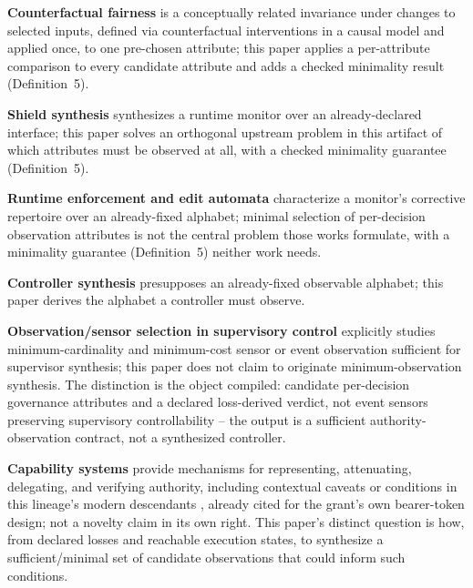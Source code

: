 \documentclass[11pt,a4paper]{article}
\theoremstyle{definition}
\begin{document}
\textbf{Counterfactual fairness} \cite{counterfactual-fairness} is a conceptually related invariance under changes to selected inputs, defined via counterfactual interventions in a causal model and applied once, to one pre-chosen attribute; this paper applies a per-attribute comparison to every candidate attribute and adds a checked minimality result (Definition~5).

\textbf{Shield synthesis} \cite{bloem-shield-synthesis-2015} synthesizes a runtime monitor over an already-declared interface; this paper solves an orthogonal upstream problem in this artifact of which attributes must be observed at all, with a checked minimality guarantee (Definition~5).

\textbf{Runtime enforcement and edit automata} \cite{schneider-enforceable-security-policies-2000,ligatti-bauer-walker-edit-automata-2005} characterize a monitor's corrective repertoire over an already-fixed alphabet; minimal selection of per-decision observation attributes is not the central problem those works formulate, with a minimality guarantee (Definition~5) neither work needs.

\textbf{Controller synthesis} \cite{ramadge-wonham-supervisory-control-1987,pnueli-rosner-reactive-synthesis-1989} presupposes an already-fixed observable alphabet; this paper derives the alphabet a controller must observe.

\textbf{Observation/sensor selection in supervisory control} \cite{rohloff-khuller-kortsarz-sensor-selection-2006,hu-chen-minimal-event-observation-2026} explicitly studies minimum-cardinality and minimum-cost sensor or event observation sufficient for supervisor synthesis; this paper does not claim to originate minimum-observation synthesis. The distinction is the object compiled: candidate per-decision governance attributes and a declared loss-derived verdict, not event sensors preserving supervisory controllability -- the output is a sufficient authority-observation contract, not a synthesized controller.

\textbf{Capability systems} \cite{dennis-van-horn-capabilities-1966} provide mechanisms for representing, attenuating, delegating, and verifying authority, including contextual caveats or conditions in this lineage's modern descendants \cite{macaroons-ndss-2014,ucan-specification,biscuit-specification}, already cited for the grant's own bearer-token design; not a novelty claim in its own right. This paper's distinct question is how, from declared losses and reachable execution states, to synthesize a sufficient/minimal set of candidate observations that could inform such conditions.
\end{document}
